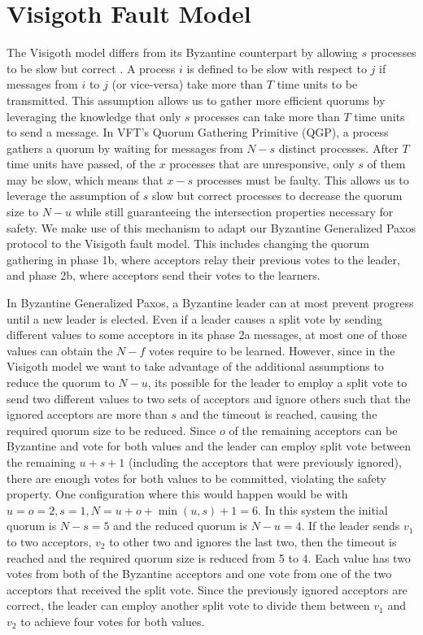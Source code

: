 \section{Visigoth Fault Model} \label{Visigoth Fault Model}

The Visigoth model differs from its Byzantine counterpart by allowing $s$ processes to be slow but correct \cite{}. A process $i$ is defined to be slow with respect to $j$ if messages from $i$ to $j$ (or vice-versa) take more than $T$ time units to be transmitted. This assumption allows us to gather more efficient quorums by leveraging the knowledge that only $s$ processes can take more than $T$ time units to send a message. In VFT's Quorum Gathering Primitive (QGP), a process gathers a quorum by waiting for messages from $N-s$ distinct processes. After $T$ time units have passed, of the $x$ processes that are unresponsive, only $s$ of them may be slow, which means that $x-s$ processes must be faulty. This allows us to leverage the assumption of $s$ slow but correct processes to decrease the quorum size to $N-u$ while still guaranteeing the intersection properties necessary for safety. We make use of this mechanism to adapt our Byzantine Generalized Paxos protocol to the Visigoth fault model. This includes changing the quorum gathering in phase 1b, where acceptors relay their previous votes to the leader, and phase 2b, where acceptors send their votes to the learners. \par
In Byzantine Generalized Paxos, a Byzantine leader can at most prevent progress until a new leader is elected. Even if a leader causes a split vote by sending different values to some acceptors in its phase 2a messages, at most one of those values can obtain the $N-f$ votes require to be learned. However, since in the Visigoth model we want to take advantage of the additional assumptions to reduce the quorum to $N-u$, its possible for the leader to employ a split vote to send two different values to two sets of acceptors and ignore others such that the ignored acceptors are more than $s$ and the timeout is reached, causing the required quorum size to be reduced. Since $o$ of the remaining acceptors can be Byzantine and vote for both values and the leader can employ split vote between the remaining $u+s+1$ (including the acceptors that were previously ignored), there are enough votes for both values to be committed, violating the safety property. One configuration where this would happen would be with $u=o=2, s=1, N=u+o+\min(u,s)+1=6$. In this system the initial quorum is $N-s=5$ and the reduced quorum is $N-u=4$. If the leader sends $v_1$ to two acceptors, $v_2$ to other two and ignores the last two, then the timeout is reached and the required quorum size is reduced from 5 to 4. Each value has two votes from both of the Byzantine acceptors and one vote from one of the two acceptors that received the split vote. Since the previously ignored acceptors are correct, the leader can employ another split vote to divide them between $v_1$ and $v_2$ to achieve four votes for both values. \par
